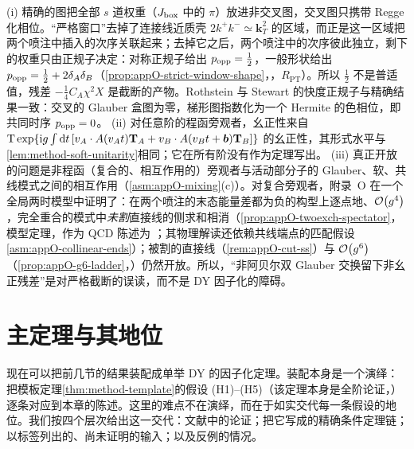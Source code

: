 \begin{remark}[共同时序是物理结果]\label{rem:dy-common-ordering}
(i) 精确的图把全部 $s$ 道权重（$J_{\rm box}$ 中的 $\pi$）放进非交叉图，交叉图只携带 Regge 化相位。“严格窗口”去掉了连接线近质壳 $2k^+k^-\simeq\mathbf k_T^2$ 的区域，而正是这一区域把两个喷注中插入的次序关联起来；去掉它之后，两个喷注中的次序彼此独立，剩下的权重只由正规子决定：对称正规子给出 $p_{\rm opp}=\frac12$，一般形状给出 $p_{\rm opp}=\frac12+2\delta_A\delta_B$（\cref{prop:appO-strict-window-shape}，\tagR，$R_{\mathrm{PT}}$）。所以 $\frac12$ 不是普适值，残差 $-\frac14C_A\chi^2X$ 是截断的产物。Rothstein 与 Stewart 的快度正规子与精确结果一致：交叉的 Glauber 盒图为零，梯形图指数化为一个 Hermite 的色相位\cite[式~(5.30)、(9.1)、(9.18)、(9.19)]{RothsteinStewart2016}，即共同时序 $p_{\rm opp}=0$。
(ii) 对任意阶的程函旁观者，幺正性来自 ${\rm T}\exp\{\mathrm{i} g\int\mathrm{d} t\,[v_A\cdot A(v_At)\mathbf T_A+v_B\cdot A(v_Bt+\boldsymbol b)\mathbf T_B]\}$ 的幺正性，其形式水平与\cref{lem:method-soft-unitarity}相同；它在所有阶没有作为定理写出。
(iii) 真正开放的问题是非程函（复合的、相互作用的）旁观者与活动部分子的 Glauber、软、共线模式之间的相互作用（\cref{asm:appO-mixing}(c)）。对复合旁观者，附录~O 在一个全局两时模型中证明了：在两个喷注的末态能量差都为负的构型上逐点地、$\mathcal{O}\!\left(g^4\right)$，完全重合的模式中\emph{未割}直接线的侧求和相消（\cref{prop:appO-twoexch-spectator}，模型定理，作为 QCD 陈述为 \tagP；其物理解读还依赖共线端点的匹配假设\cref{asm:appO-collinear-ends}）；被割的直接线（\cref{rem:appO-cut-ss}）与 $\mathcal{O}\!\left(g^6\right)$（\cref{prop:appO-g6-ladder}，\tagA）仍然开放。所以，“非阿贝尔双 Glauber 交换留下非幺正残差”是对严格截断的误读，而不是 DY 因子化的障碍。
\end{remark}

\section{主定理与其地位}\label{sec:dy-theorem}

现在可以把前几节的结果装配成单举 DY 的因子化定理。装配本身是一个演绎：把模板定理\cref{thm:method-template}的假设 (H1)--(H5)（该定理本身是全阶论证，\tagA）逐条对应到本章的陈述。这里的难点不在演绎，而在于如实交代每一条假设的地位。我们按四个层次给出这一交代：文献中的论证；把它写成的精确条件定理链；以标签列出的、尚未证明的输入；以及反例的情况。

